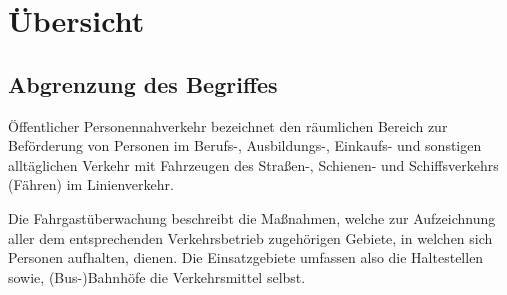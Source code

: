 \section{Übersicht}
\subsection{Abgrenzung des Begriffes} %
Öffentlicher Personennahverkehr bezeichnet den \glqq{}räumlichen Bereich zur Beförderung von Personen im Berufs-,
Ausbildungs-, Einkaufs- und sonstigen alltäglichen Verkehr mit Fahrzeugen des Straßen-, Schienen- und Schiffsverkehrs (Fähren) im Linienverkehr.
\grqq{} \cite{Dr.FriedrichvonStackelbergDr.RobertMalina.2018}

Die Fahrgastüberwachung beschreibt die Maßnahmen, welche zur Aufzeichnung aller dem entsprechenden Verkehrsbetrieb zugehörigen Gebiete, in welchen sich Personen aufhalten, dienen.
Die Einsatzgebiete umfassen also die Haltestellen sowie, (Bus-)Bahnhöfe die Verkehrsmittel selbst.




